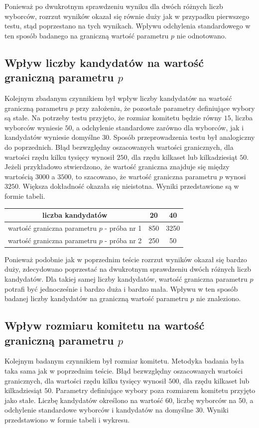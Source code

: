 \documentclass[pdflatex,11pt]{../aghdoc_version2}
\begin{document}
Ponieważ po dwukrotnym sprawdzeniu wyniku dla dwóch różnych liczb wyborców, rozrzut wyników okazał się równie duży jak w przypadku pierwszego testu, stąd poprzestano na tych wynikach. Wpływu odchylenia standardowego w ten sposób badanego na graniczną wartość parametru $p$ nie odnotowano.

\subsection{Wpływ liczby kandydatów na wartość graniczną parametru $p$}
Kolejnym zbadanym czynnikiem był wpływ liczby kandydatów na wartość graniczną parametru $p$ przy założeniu, że pozostałe parametry definiujące wybory są stałe. Na potrzeby testu przyjęto, że rozmiar komitetu będzie równy $15$, liczba wyborców wyniesie $50$, a odchylenie standardowe zarówno dla wyborców, jak i kandydatów wyniesie domyślne $30$. Sposób przeprowadzenia testu był analogiczny do poprzednich. Błąd bezwzględny oszacowanych wartości granicznych, dla wartości rzędu kilku tysięcy wynosił $250$, dla rzędu kilkaset lub kilkadziesiąt $50$. Jeżeli przykładowo stwierdzono, że wartość graniczna znajduje się między wartością $3000$ a $3500$, to szacowano, że wartość graniczna parametru $p$ wynosi $3250$. Większa dokładność okazała się nieistotna. Wyniki przedstawione są w formie tabeli.

\begin{center}
\begin{tabular}{|c|c|c|}
   \hline
   liczba kandydatów & 20 & 40 \\
   \hline
   wartość graniczna parametru $p$ - próba nr 1 & 850 & 3250 \\
   \hline
   wartość graniczna parametru $p$ - próba nr 2 & 250 & 50 \\
   \hline
\end{tabular}
\end{center}

Ponieważ podobnie jak w poprzednim teście rozrzut wyników okazał się bardzo duży, zdecydowano poprzestać na dwukrotnym sprawdzeniu dwóch różnych liczb kandydatów. Dla takiej samej liczby kandydatów, wartość graniczna parametru $p$ potrafi być jednocześnie i bardzo duża i bardzo mała. Wpływu w ten sposób badanej liczby kandydatów na graniczną wartość parametru $p$ nie znaleziono.

\subsection{Wpływ rozmiaru komitetu na wartość graniczną parametru $p$}
Kolejnym badanym czynnikiem był rozmiar komitetu. Metodyka badania była taka sama jak w poprzednim teście. Błąd bezwzględny oszacowanych wartości granicznych, dla wartości rzędu kilku tysięcy wynosił $500$, dla rzędu kilkaset lub kilkadziesiąt $50$. Parametry definiujące wybory poza rozmiarem komitetu przyjęto jako stałe. Liczbę kandydatów określono na wartość $60$, liczbę wyborców na 50, a odchylenie standardowe wyborców i kandydatów na domyślne $30$. Wyniki przedstawiono w formie tabeli i wykresu.
\end{document}
